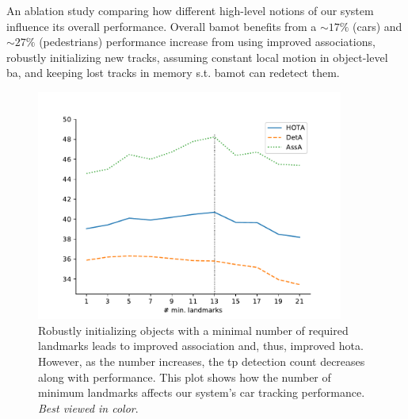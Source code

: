 \documentclass[headsepline, hidelinks, footsepline, footinclude=false, oneside, fontsize=11pt, paper=a4, listof=totoc, bibliography=totoc]{scrbook}
\begin{document}
\begin{table}
{}
\caption{An ablation study comparing how different high-level notions of our system influence its overall performance.
Overall \gls{bamot} benefits from a $\sim17\%$ (cars) and $\sim27\%$ (pedestrians) performance increase from using improved associations, robustly initializing new tracks, assuming constant local motion in object-level \gls{ba},
and keeping lost tracks in memory s.t. \gls{bamot} can redetect them.}
\label{tab:hota-ablation}
\end{table}

\begin{figure}[htbp]
\centering
\includegraphics[width=0.9\textwidth]{figures/min-lm-plot.pdf}
\caption{\label{fig:min-lm-plot}Robustly initializing objects with a minimal number of required landmarks leads to improved association and, thus, improved \gls{hota}. However, as the number increases, the \gls{tp} detection count decreases along with performance. This plot shows how the number of minimum landmarks affects our system's car tracking performance. \emph{Best viewed in color}.}
\end{figure}
\end{document}
